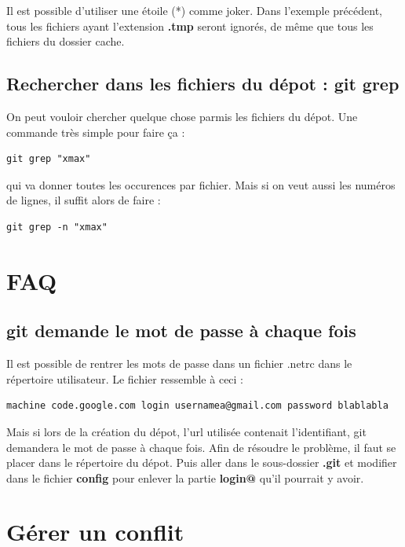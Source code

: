 \documentclass[a4paper,twoside]{article}
\begin{document}
Il est possible d'utiliser une étoile (*) comme joker. Dans l'exemple précédent, tous les fichiers ayant l'extension \textbf{.tmp} seront ignorés, de même que tous les fichiers du dossier cache.

\subsection{Rechercher dans les fichiers du dépot : git grep}
On peut vouloir chercher quelque chose parmis les fichiers du dépot. Une commande très simple pour faire ça : 
\begin{verbatim}
git grep "xmax"
\end{verbatim}
qui va donner toutes les occurences par fichier. Mais si on veut aussi les numéros de lignes, il suffit alors de faire :
\begin{verbatim}
git grep -n "xmax"
\end{verbatim}

\section{FAQ}
\subsection{git demande le mot de passe à chaque fois}
Il est possible de rentrer les mots de passe dans un fichier .netrc dans le répertoire utilisateur. Le fichier ressemble à ceci :
\begin{verbatim}
machine code.google.com login usernamea@gmail.com password blablabla
\end{verbatim}

Mais si lors de la création du dépot, l'url utilisée contenait l'identifiant, git demandera le mot de passe à chaque fois. Afin de résoudre le problème, il faut se placer dans le répertoire du dépot. Puis aller dans le sous-dossier \textbf{.git} et modifier dans le fichier \textbf{config} pour enlever la partie \textbf{login@} qu'il pourrait y avoir.


\section{Gérer un conflit}


\printindex
\end{document}
